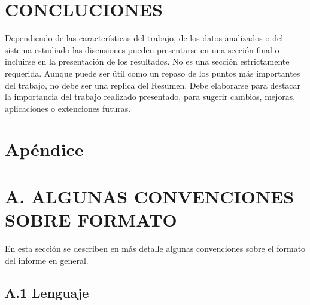 \documentclass[a4paper, 10pt, conference]{ieeeconf}      %
\begin{document}
\section{CONCLUCIONES}

Dependiendo de las caracter\'isticas del trabajo, de los datos analizados o del sistema estudiado las discusiones pueden presentarse en una secci\'on final o incluirse en la presentaci\'on de los resultados. No es una secci\'on estrictamente requerida. Aunque puede ser \'util como un repaso de los puntos m\'as importantes del trabajo, no debe ser una replica del Resumen. Debe elaborarse para destacar la importancia del trabajo realizado presentado, para sugerir cambios, mejoras, aplicaciones o extenciones futuras.
 

\addtolength{\textheight}{-12cm}   %







\section*{Ap\'endice}


\section*{A.  ALGUNAS CONVENCIONES SOBRE FORMATO}

En esta secci\'on se describen en m\'as detalle algunas convenciones sobre el formato del informe en general.

\subsection*{A.1     Lenguaje}
\end{document}
